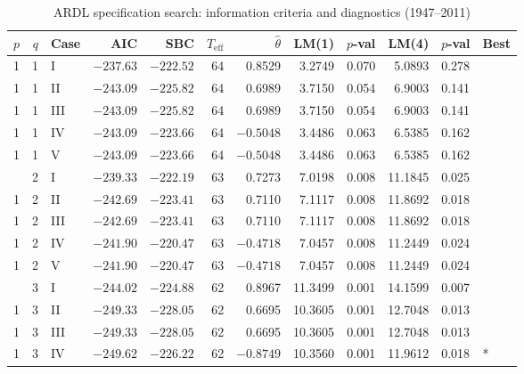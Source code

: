 \begin{landscape}
\begin{longtable}[t]{rrlrrrrrrrll}
\caption{ARDL specification search: information criteria and diagnostics (1947--2011)}\label{tab:app_ardl_search}\\
\toprule
$p$ & $q$ & Case & AIC & SBC & $T_{\text{eff}}$ & $\hat{\theta}$ & LM(1) & $p$-val & LM(4) & $p$-val & Best \\
\midrule
1 & 1 & I & $-237.63$ & $-222.52$ & 64 & 0.8529 & 3.2749 & 0.070 & 5.0893 & 0.278 & \\
1 & 1 & II & $-243.09$ & $-225.82$ & 64 & 0.6989 & 3.7150 & 0.054 & 6.9003 & 0.141 & \\
1 & 1 & III & $-243.09$ & $-225.82$ & 64 & 0.6989 & 3.7150 & 0.054 & 6.9003 & 0.141 & \\
1 & 1 & IV & $-243.09$ & $-223.66$ & 64 & $-0.5048$ & 3.4486 & 0.063 & 6.5385 & 0.162 & \\
1 & 1 & V & $-243.09$ & $-223.66$ & 64 & $-0.5048$ & 3.4486 & 0.063 & 6.5385 & 0.162 & \\
\addlinespace
1 & 2 & I & $-239.33$ & $-222.19$ & 63 & 0.7273 & 7.0198 & 0.008 & 11.1845 & 0.025 & \\
1 & 2 & II & $-242.69$ & $-223.41$ & 63 & 0.7110 & 7.1117 & 0.008 & 11.8692 & 0.018 & \\
1 & 2 & III & $-242.69$ & $-223.41$ & 63 & 0.7110 & 7.1117 & 0.008 & 11.8692 & 0.018 & \\
1 & 2 & IV & $-241.90$ & $-220.47$ & 63 & $-0.4718$ & 7.0457 & 0.008 & 11.2449 & 0.024 & \\
1 & 2 & V & $-241.90$ & $-220.47$ & 63 & $-0.4718$ & 7.0457 & 0.008 & 11.2449 & 0.024 & \\
\addlinespace
1 & 3 & I & $-244.02$ & $-224.88$ & 62 & 0.8967 & 11.3499 & 0.001 & 14.1599 & 0.007 & \\
1 & 3 & II & $-249.33$ & $-228.05$ & 62 & 0.6695 & 10.3605 & 0.001 & 12.7048 & 0.013 & \\
1 & 3 & III & $-249.33$ & $-228.05$ & 62 & 0.6695 & 10.3605 & 0.001 & 12.7048 & 0.013 & \\
1 & 3 & IV & $-249.62$ & $-226.22$ & 62 & $-0.8749$ & 10.3560 & 0.001 & 11.9612 & 0.018 & * \\

\end{longtable}
\end{landscape}
